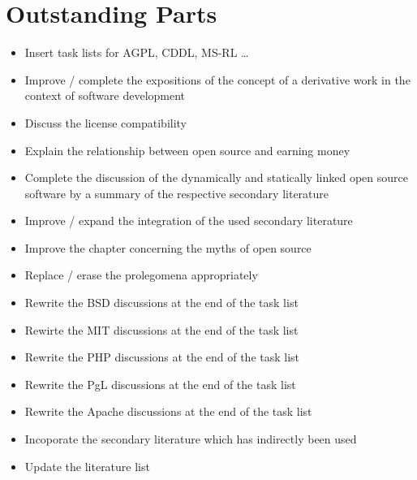 %
%
%
%


\chapter*{Outstanding Parts} 

\begin{footnotesize}
\begin{itemize}
  \item Insert task lists for AGPL, CDDL, MS-RL \ldots
  \item Improve / complete the expositions of the concept of a derivative work
  in the context of software development
  \item Discuss the license compatibility
  \item Explain the relationship between open source and earning money
  \item Complete the discussion of the dynamically and statically linked open
  source software by a summary of the respective secondary literature
  \item Improve / expand the integration of the used secondary literature
  \item Improve the chapter concerning the myths of open source
  \item Replace / erase the prolegomena appropriately
  \item Rewrite the BSD discussions at the end of the task list 
  \item Rewirte the MIT discussions at the end of the task list
  \item Rewrite the PHP discussions at the end of the task list
  \item Rewrite the PgL discussions at the end of the task list
  \item Rewrite the Apache discussions at the end of the task list
  \item Incoporate the secondary literature which has indirectly been used
  \item Update the literature list
\end{itemize}
\end{footnotesize}

%
